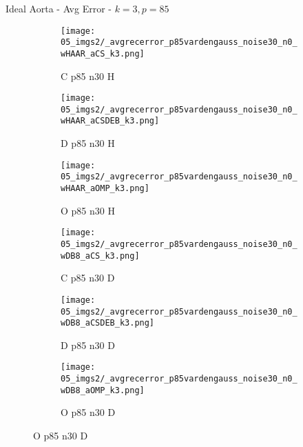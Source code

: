 \begin{frame}{Ideal Aorta - Avg Error - $k=3,p=85$}{}
\begin{figure}
\begin{subfigure}{0.13\textwidth}
\texttt{[image: 05\_imgs2/\_avgrecerror\_p85vardengauss\_noise30\_n0\_wHAAR\_aCS\_k3.png]}
\caption*{\tiny C p85 n30 H}
\end{subfigure}
\begin{subfigure}{0.13\textwidth}
\texttt{[image: 05\_imgs2/\_avgrecerror\_p85vardengauss\_noise30\_n0\_wHAAR\_aCSDEB\_k3.png]}
\caption*{\tiny D p85 n30 H}
\end{subfigure}
\begin{subfigure}{0.13\textwidth}
\texttt{[image: 05\_imgs2/\_avgrecerror\_p85vardengauss\_noise30\_n0\_wHAAR\_aOMP\_k3.png]}
\caption*{\tiny O p85 n30 H}
\end{subfigure}
\begin{subfigure}{0.13\textwidth}
\texttt{[image: 05\_imgs2/\_avgrecerror\_p85vardengauss\_noise30\_n0\_wDB8\_aCS\_k3.png]}
\caption*{\tiny C p85 n30 D}
\end{subfigure}
\begin{subfigure}{0.13\textwidth}
\texttt{[image: 05\_imgs2/\_avgrecerror\_p85vardengauss\_noise30\_n0\_wDB8\_aCSDEB\_k3.png]}
\caption*{\tiny D p85 n30 D}
\end{subfigure}
\begin{subfigure}{0.13\textwidth}
\texttt{[image: 05\_imgs2/\_avgrecerror\_p85vardengauss\_noise30\_n0\_wDB8\_aOMP\_k3.png]}
\caption*{\tiny O p85 n30 D}
\end{subfigure}
\end{figure}
\end{frame}

